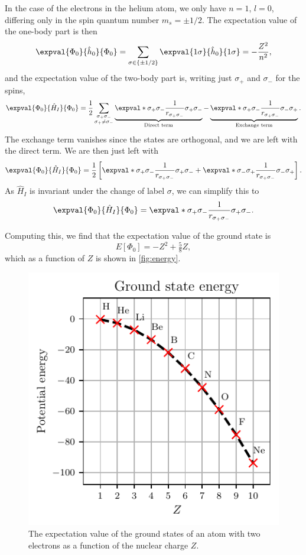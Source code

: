 In the case of the electrons in the helium atom, we only have $n = 1$, $l = 0$, differing only in the spin quantum number $m_s = \pm 1/2$.
The expectation value of the one-body part is then
\begin{equation*}
    \expval{\Phi_0}{\hat{h}_0}{\Phi_0} = \sum_{\sigma \in \{\pm 1/2\}} \expval{1\sigma}{\hat{h}_0}{1\sigma} = -\frac{Z^2}{n^2},
\end{equation*}
and the expectation value of the two-body part is, writing just $\sigma_{+}$ and $\sigma_{-}$ for the spins,
\begin{equation*}
    \expval{\Phi_0}{\hat{H}_I}{\Phi_0}
    = \frac{1}{2} \sum_{\substack{\sigma_{+}\sigma_{-}\\ \sigma_{+} \neq \sigma_{-}}}
    \underbrace{\expval*{\sigma_{+} \sigma_{-}}{\frac{1}{r_{\sigma_{+}\sigma_{-}}}}{\sigma_{+} \sigma_{-}}}_{\textnormal{Direct term}}
    - \underbrace{\expval*{\sigma_{+} \sigma_{-}}{\frac{1}{r_{\sigma_{+}\sigma_{-}}}}{\sigma_{-}\sigma_{+}}}_{\textnormal{Exchange term}}.
\end{equation*}
The exchange term vanishes since the states are orthogonal, and we are left with the direct term.
We are then just left with
\begin{equation*}
    \expval{\Phi_0}{\hat{H}_I}{\Phi_0} = \frac{1}{2}\left[ \expval*{\sigma_{+} \sigma_{-}}{\frac{1}{r_{\sigma_{+} \sigma_{-}}}}{\sigma_{+} \sigma_{-}} + \expval*{\sigma_{-} \sigma_{+}}{\frac{1}{r_{\sigma_{+} \sigma_{-}}}}{\sigma_{-} \sigma_{+}}\right].
\end{equation*}
As $\hat{H}_I$ is invariant under the change of label $\sigma$, we can simplify this to
\begin{equation*}
    \expval{\Phi_0}{\hat{H}_I}{\Phi_0} = \expval*{\sigma_{+} \sigma_{-}}{\frac{1}{r_{\sigma_{+} \sigma_{-}}}}{\sigma_{+} \sigma_{-}}.
\end{equation*}

Computing this, we find that the expectation value of the ground state is
\begin{equation}
    E[\Phi_0] = -Z^2 + \tfrac{5}{8}Z,
\end{equation}
which as a function of $Z$ is shown in \autoref{fig:energy}.

\begin{figure}[ht]
    \centering
    \includegraphics{figs/energy_plot.pdf}
    \caption{The expectation value of the ground states of an atom with two electrons as a function of the nuclear charge $Z$.\label{fig:energy}}
\end{figure}
